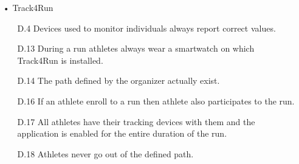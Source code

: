 \begin{enumerate}
\item[•] {\Large Track4Run}
	\begin{enumerate}
	\item [D.4] Devices used to monitor individuals always report correct values.
	\item [D.13] During a run athletes always wear a smartwatch on which Track4Run is installed.
	\item [D.14] The path defined by the organizer actually exist.
    \item [D.16] If an athlete enroll to a run then athlete also participates to the run.
    \item [D.17] All athletes have their tracking devices with them and the application is enabled for the entire duration of the run.
    \item [D.18] Athletes never go out of the defined path.
	\end{enumerate}
\end{enumerate}